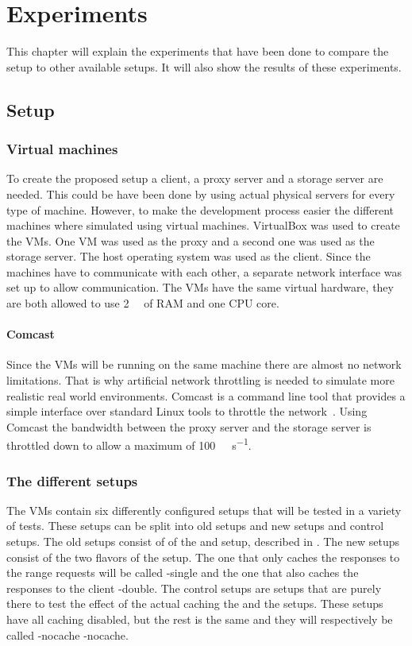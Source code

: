 \documentclass[twoside,openright]{uva-bachelor-thesis}
\newcommand{\mbps}[1]{\SI[per-mode=symbol]{#1}{\mega\bit\per\second}}
\begin{document}
\chapter{Experiments}
This chapter will explain the experiments that have been done to compare the
\lt setup to other available setups. It will also show the results of these
experiments.

\section{Setup}

\subsection{Virtual machines}
To create the proposed setup a client, a proxy server and a storage server are
needed. This could be have been done by using actual physical servers for every
type of machine. However, to make the development process easier the different
machines where simulated using virtual machines. VirtualBox was used to create
the VMs. One VM was used as the proxy and a second one was used as the storage
server. The host operating system was used as the client. Since the machines
have to communicate with each other, a separate network interface was set up to
allow communication. The VMs have the same virtual hardware, they are both
allowed to use \SI{2}{\giga\byte} of RAM and one CPU core.

\subsubsection{Comcast}
Since the VMs will be running on the same machine there are almost no network
limitations. That is why artificial network throttling is needed to simulate
more realistic real world environments. Comcast is a command line tool that
provides a simple interface over standard Linux tools to throttle the
network~\autocite{comcast}. Using Comcast the bandwidth between the proxy server
and the storage server is throttled down to allow a maximum of
\mbps{100}.


\subsection{The different setups}
The VMs contain six differently configured setups that will be tested in a
variety of tests.  These setups can be split into old setups and new setups and
control setups. The old setups consist of of the \cdn and \ipp setup, described
in . The new setups consist of the two flavors of the \lt
setup. The one that only caches the responses to the range requests will be
called \lt-single and the one that also caches the responses to the client
\lt-double. The control setups are setups that are purely there to test the
effect of the actual caching the \lt and the \cdn setups. These setups have all
caching disabled, but the rest is the same and they will respectively be called
\lt-nocache \cdn-nocache.
\end{document}
